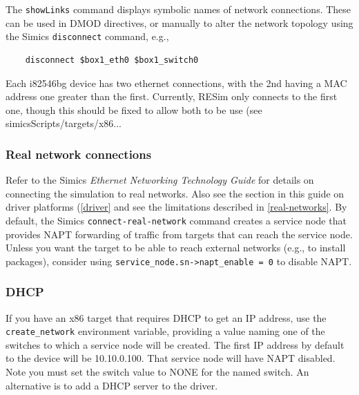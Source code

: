 \documentclass[titlepage]{article}
\begin{document}
The {\tt showLinks} command displays symbolic names of network connections.  These can be used in DMOD directives, or manually to alter
the network topology using the Simics {\tt disconnect} command, e.g., 
\begin{verbatim}
    disconnect $box1_eth0 $box1_switch0
\end{verbatim}

Each i82546bg device has two ethernet connections, with the 2nd having a MAC address one greater than the first.  Currently, RESim only connects to the first one,
though this should be fixed to allow both to be use (see simicsScripts/targets/x86...

\subsubsection{Real network connections}
Refer to the Simics \textit{Ethernet Networking Technology Guide} for details on connecting the simulation to real networks.
Also see the section in this guide on driver platforms (\ref{driver} and see the limitations described in \ref{real-networks}.  
By default, the Simics {\tt connect-real-network} command creates a service
node that provides NAPT forwarding of traffic from targets that can reach the service node.  Unless you want the target to be able to
reach external networks (e.g., to install packages), consider using {\tt service\_node.sn->napt\_enable = 0} to disable NAPT.

\subsubsection{DHCP}
\label{DHCP}
If you have an x86 target that requires DHCP to get an IP address, use the {\tt create\_network} environment variable, providing a value
naming one of the switches to which a service node will be created.  The first IP address by default to the device will be 10.10.0.100.
That service node will have NAPT disabled.  Note you must set the switch value to NONE for the named switch.  An alternative is to add
a DHCP server to the driver.
\end{document}
